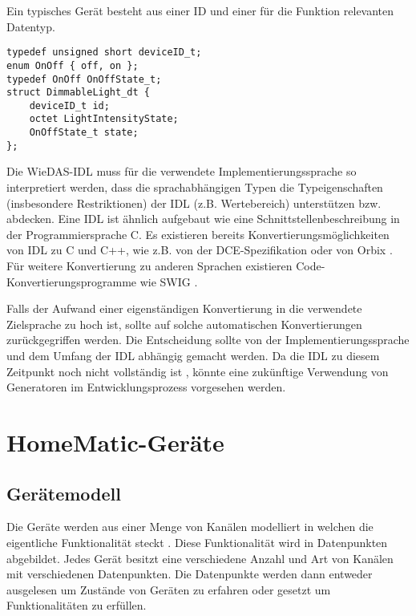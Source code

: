 \begin{absolutelynopagebreak}
Ein typisches Gerät besteht aus einer ID und einer für die Funktion relevanten Datentyp.

\lstset{language=IDL}
\begin{lstlisting}[frame=single,caption={Gerätebeschreibung eines dimmbaren Lichts in WieDAS}]
typedef unsigned short deviceID_t;
enum OnOff { off, on };
typedef OnOff OnOffState_t;
struct DimmableLight_dt {
	deviceID_t id;
	octet LightIntensityState;
	OnOffState_t state;
};
\end{lstlisting}
\end{absolutelynopagebreak}

Die WieDAS-IDL muss für die verwendete Implementierungssprache so interpretiert werden, dass die
sprachabhängigen Typen die Typeigenschaften (insbesondere Restriktionen) der IDL (z.B. Wertebereich)
unterstützen bzw. abdecken.
Eine IDL ist ähnlich aufgebaut wie eine Schnittstellenbeschreibung in der Programmiersprache C.
Es existieren bereits Konvertierungsmöglichkeiten von IDL zu C und C++, wie z.B. von der
DCE-Spezifikation \cite{cde} oder von Orbix \cite{orbix}.
Für weitere Konvertierung zu anderen Sprachen existieren Code-Konvertierungsprogramme wie SWIG \cite{swig}.

Falls der Aufwand einer eigenständigen Konvertierung in die verwendete Zielsprache zu hoch ist, sollte
auf solche automatischen Konvertierungen zurückgegriffen werden.
Die Entscheidung sollte von der Implementierungssprache und dem Umfang der IDL abhängig gemacht werden.
Da die IDL zu diesem Zeitpunkt noch nicht vollständig ist \cite{wiedas_onto},
 könnte eine zukünftige Verwendung von Generatoren im Entwicklungsprozess vorgesehen werden.

\section{HomeMatic-Geräte}
\label{ana_hm}

\subsection{Gerätemodell}
\label{ana_hm_modell}
Die Geräte werden aus einer Menge von Kanälen modelliert \cite[Seite 13]{hmscript2} in welchen
die eigentliche Funktionalität steckt \cite[Seite 16]{hmscript2}.
Diese Funktionalität wird in Datenpunkten abgebildet.
Jedes Gerät besitzt eine verschiedene Anzahl und Art von Kanälen mit verschiedenen Datenpunkten.
Die Datenpunkte werden dann entweder ausgelesen um Zustände von Geräten zu erfahren oder gesetzt
um Funktionalitäten zu erfüllen.


